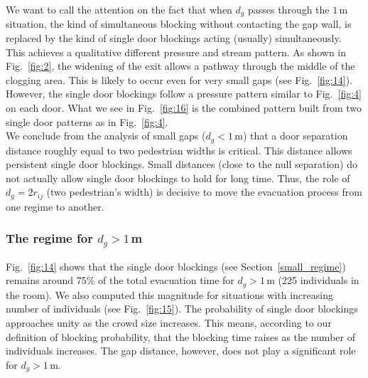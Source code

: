 We want to call the attention on the fact that when $d_g$ passes through the 
$1\,$m situation, the kind of simultaneous blocking without contacting the gap 
wall, is replaced by the kind of single door blockings acting (usually) 
simultaneously. This achieves a qualitative different pressure and 
stream pattern. As shown in Fig.~\ref{fig:2}, the widening of the exit 
allows a pathway through the middle of the clogging area. This is likely to 
occur even for very small gaps (see Fig.~\ref{fig:14}). However, the single door 
blockings follow a pressure pattern similar to  Fig.~\ref{fig:4} on each door.  
What we see in Fig.~\ref{fig:16} is the combined pattern built from two 
single door patterns as in Fig.~\ref{fig:4}. \\

We conclude from the analysis of small gaps ($d_g<1\,$m) that a door 
separation distance roughly equal to two pedestrian widths is critical. 
This distance allows persistent single door blockings. Small distances (close 
to the null separation) do not actually allow single door blockings to hold for 
long time. Thus, the role of $d_g=2r_{ij}$ (two pedestrian's width) is decisive to move the evacuation 
process from one regime to another. \\ 


\subsubsection{\label{large_regime} The regime for $d_g>1\,$m}

Fig.~\ref{fig:14} shows that the single door blockings (see 
 Section~\ref{small_regime}) remains around 75\% of the total evacuation time 
for $d_g>1\,$m (225 individuals in the room). We also computed this magnitude 
for situations with increasing number of individuals (see Fig.~\ref{fig:15}). 
The probability of single door blockings approaches unity as the crowd size 
increases. This means, according to our definition of blocking probability, 
that the blocking time raises as the number of individuals increases. The gap 
distance, however, does not play a significant role for $d_g>1\,$m.  \\ 


